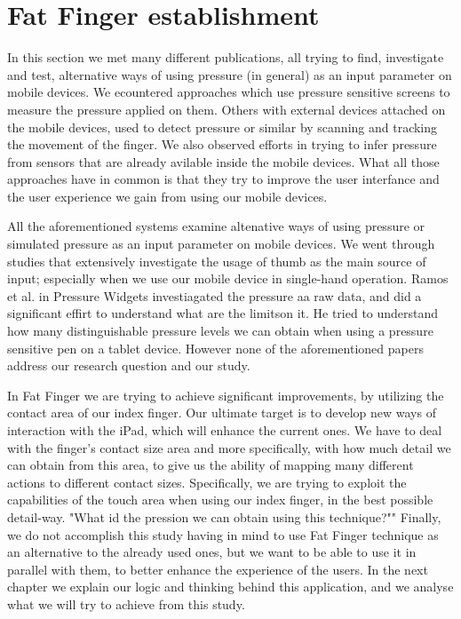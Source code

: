 \section{Fat Finger establishment}

In this section we met many different publications, all trying to find, investigate and test, alternative ways of using pressure (in general) as an input parameter on mobile devices. We ecountered approaches which use pressure sensitive screens to measure the pressure applied on them. Others with external devices attached on the mobile devices, used to detect pressure or similar by scanning and tracking the movement of the finger. We also observed efforts in trying to infer pressure from sensors that are already avilable inside the mobile devices. What all those approaches have in common is that they try to improve the user interfance and the user experience we gain from using our mobile devices.

All the aforementioned systems examine altenative ways of using pressure or simulated pressure as an input parameter on mobile devices. We went through studies that extensively investigate the usage of thumb as the main source of input; especially when we use our mobile device in single-hand operation. Ramos et al. in Pressure Widgets \cite{Ramos2004} investiagated the pressure aa raw data, and did a significant effirt to understand what are the limitson it. He tried to understand how many distinguishable pressure levels we can obtain when using a pressure sensitive pen on a tablet device. However none of the aforementioned papers address our research question and our study.

In Fat Finger we are trying to achieve significant improvements, by utilizing the contact area of our index finger. Our ultimate target is to develop new ways of interaction with the iPad, which will enhance the current ones. We have to deal with the finger’s contact size area and more specifically, with how much detail we can obtain from this area, to give us the ability of mapping many different actions to different contact sizes. Specifically, we are trying to exploit the capabilities of the touch area when using our index finger, in the best possible detail-way. "What id the pression we can obtain using this technique?"" Finally, we do not accomplish this study having in mind to use Fat Finger technique as an alternative to the already used ones, but we want to be able to use it in parallel with them, to better enhance the experience of the users. In the next chapter we explain our logic and thinking behind this application, and we analyse what we will try to achieve from this study.